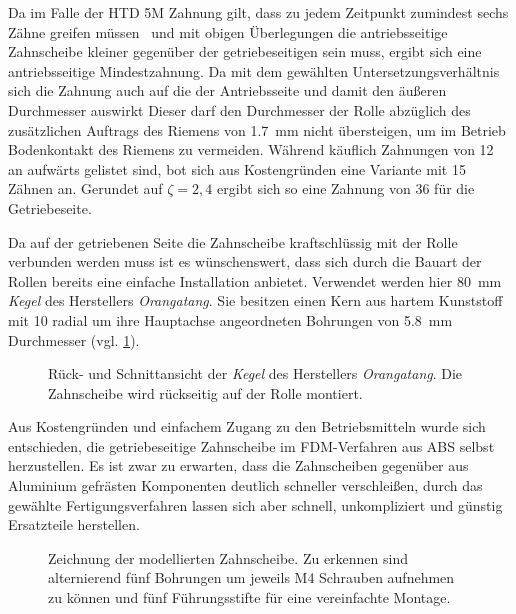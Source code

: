 		Da im Falle der HTD 5M Zahnung gilt, dass zu jedem Zeitpunkt zumindest sechs Zähne greifen müssen~\cite{MAEDLERGmbH.2021} und mit obigen Überlegungen die antriebsseitige Zahnscheibe kleiner gegenüber der getriebeseitigen sein muss, ergibt sich eine antriebsseitige Mindestzahnung.
		Da mit dem gewählten Untersetzungsverhältnis sich die Zahnung auch auf die der Antriebsseite und damit den äußeren Durchmesser auswirkt
		Dieser darf den Durchmesser der Rolle abzüglich des zusätzlichen Auftrags des Riemens von \qty{1,7}{\milli\metre}\cite{gates.catalogue.2021} nicht übersteigen, um im Betrieb Bodenkontakt des Riemens zu vermeiden.
		Während käuflich Zahnungen von 12 an aufwärts gelistet sind, bot sich aus Kostengründen eine Variante mit 15 Zähnen an.
		Gerundet auf \(\zeta=2,4\) ergibt sich so eine Zahnung von 36 für die Getriebeseite.
		
		Da auf der getriebenen Seite die Zahnscheibe kraftschlüssig mit der Rolle verbunden werden muss ist es wünschenswert, dass sich durch die Bauart der Rollen bereits eine einfache Installation anbietet.
		Verwendet werden hier \qty{80}{\milli\metre} \textit{Kegel} des Herstellers \textit{Orangatang}.
		Sie besitzen einen Kern aus hartem Kunststoff mit 10 radial um ihre Hauptachse angeordneten Bohrungen von \qty{5,8}{\milli\metre} Durchmesser (vgl. \cref{fig:kegels}).
		\begin{figure}[h]
			\centering
			
			\caption[Rück- und Schnittansicht der \textit{Kegel} des Herstellers \textit{Orangatang}]{Rück- und Schnittansicht der \textit{Kegel} des Herstellers \textit{Orangatang}. Die Zahnscheibe wird rückseitig auf der Rolle montiert.}
			\label{fig:kegels}
		\end{figure}

		Aus Kostengründen und einfachem Zugang zu den Betriebsmitteln wurde sich entschieden, die getriebeseitige Zahnscheibe im FDM-Verfahren aus ABS selbst herzustellen.
		Es ist zwar zu erwarten, dass die Zahnscheiben gegenüber aus Aluminium gefrästen Komponenten deutlich schneller verschleißen, durch das gewählte Fertigungsverfahren lassen sich aber schnell, unkompliziert und günstig Ersatzteile herstellen.
		\begin{figure}[h]
			\centering
			
			\caption[Zeichnung der modellierten Zahnscheibe]{Zeichnung der modellierten Zahnscheibe. Zu erkennen sind alternierend fünf Bohrungen um jeweils M4 Schrauben aufnehmen zu können und fünf Führungsstifte für eine vereinfachte Montage.}
			\label{fig:htd 5m driven}
		\end{figure}

